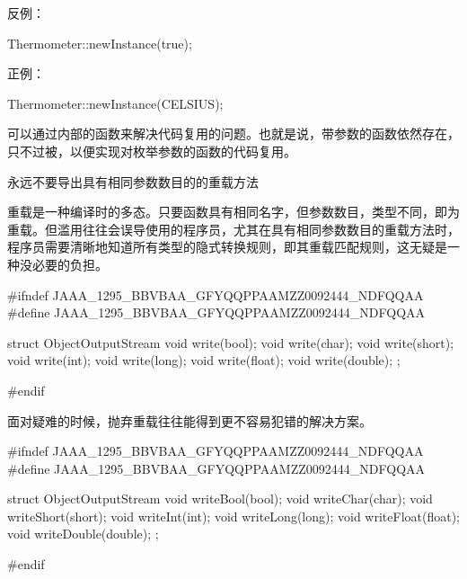 \begin{content}
反例：
\begin{leftbar}
\begin{c++}
Thermometer::newInstance(true);
\end{c++}
\end{leftbar}

正例：
\begin{leftbar}
\begin{c++}
Thermometer::newInstance(CELSIUS);
\end{c++}
\end{leftbar}

可以通过内部的函数来解决代码复用的问题。也就是说，带参数的函数依然存在，只不过被，以便实现对枚举参数的函数的代码复用。

\begin{regulation}
永远不要导出具有相同参数数目的的重载方法
\end{regulation}

重载是一种编译时的多态。只要函数具有相同名字，但参数数目，类型不同，即为重载。但滥用往往会误导使用的程序员，尤其在具有相同参数数目的重载方法时，程序员需要清晰地知道所有类型的隐式转换规则，即其重载匹配规则，这无疑是一种没必要的负担。

\begin{leftbar}
\begin{c++}[caption={io/ObjectOutputStream.h}]
#ifndef JAAA_1295_BBVBAA_GFYQQPPAAMZZ0092444_NDFQQAA
#define JAAA_1295_BBVBAA_GFYQQPPAAMZZ0092444_NDFQQAA

struct ObjectOutputStream
{
    void write(bool);
    void write(char);
    void write(short);
    void write(int);
    void write(long);
    void write(float);
    void write(double);
};

#endif
\end{c++}
\end{leftbar}

面对疑难的时候，抛弃重载往往能得到更不容易犯错的解决方案。

\begin{leftbar}
\begin{c++}[caption={io/ObjectOutputStream.h}]
#ifndef JAAA_1295_BBVBAA_GFYQQPPAAMZZ0092444_NDFQQAA
#define JAAA_1295_BBVBAA_GFYQQPPAAMZZ0092444_NDFQQAA

struct ObjectOutputStream
{
    void writeBool(bool);
    void writeChar(char);
    void writeShort(short);
    void writeInt(int);
    void writeLong(long);
    void writeFloat(float);
    void writeDouble(double);
};

#endif
\end{c++}
\end{leftbar}


\end{content}

